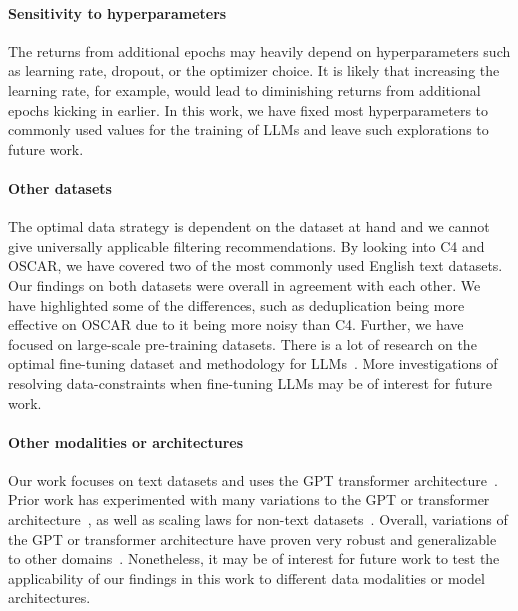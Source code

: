 \documentclass{article}
\begin{document}
\paragraph{Sensitivity to hyperparameters} The returns from additional epochs may heavily depend on hyperparameters such as learning rate, dropout, or the optimizer choice. It is likely that increasing the learning rate, for example, would lead to diminishing returns from additional epochs kicking in earlier. In this work, we have fixed most hyperparameters to commonly used values for the training of LLMs and leave such explorations to future work.

\paragraph{Other datasets} The optimal data strategy is dependent on the dataset at hand and we cannot give universally applicable filtering recommendations. By looking into C4 and OSCAR, we have covered two of the most commonly used English text datasets. Our findings on both datasets were overall in agreement with each other. We have highlighted some of the differences, such as deduplication being more effective on OSCAR due to it being more noisy than C4. Further, we have focused on large-scale pre-training datasets. There is a lot of research on the optimal fine-tuning dataset and methodology for LLMs~\cite{sanh2022multitask,longpre2023flan,yong2022bloom+,ouyang2022training,wei2021finetuned,min2021metaicl,wang2022self,zhou2023lima,wang2023far,gupta2023instruction,xu2023wizardlm,muennighoff2023octopack,longpre2023data}. More investigations of resolving data-constraints when fine-tuning LLMs may be of interest for future work.

\paragraph{Other modalities or architectures} Our work focuses on text datasets and uses the GPT transformer architecture~\cite{radford2019language}. Prior work has experimented with many variations to the GPT or transformer architecture~\cite{dehghani2018universal,tay2022scaling,scao2022language}, as well as scaling laws for non-text datasets~\cite{aghajanyan2023scaling}. Overall, variations of the GPT or transformer architecture have proven very robust and generalizable to other domains~\cite{huang2018music,chen2020generative,muennighoff2020vilio,madani2020progen,muennighoff2022sgpt,tay2022scaling,dehghani2023scaling}. Nonetheless, it may be of interest for future work to test the applicability of our findings in this work to different data modalities or model architectures.
\end{document}
